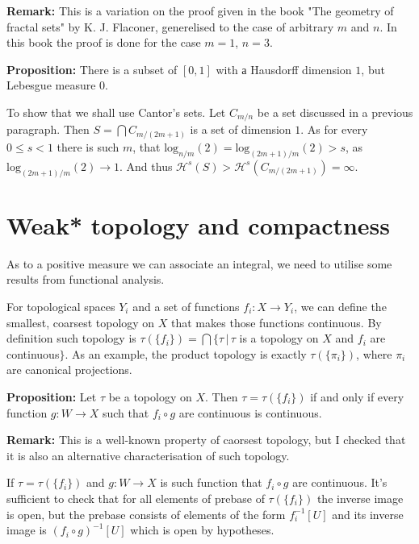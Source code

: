 \documentclass{article}
\begin{document}
\vspace{1ex}
\textbf{Remark:} This is a variation on the proof given in the book "The geometry
of fractal sets" by K. J. Flaconer, generelised to the case of arbitrary $m$ and
$n$. In this book the proof is done for the case $m=1$, $n=3$.

\vspace{1ex}
\textbf{Proposition:} There is a subset of $[0,1]$ with а Hausdorff dimension
$1$, but Lebesgue measure 0.

\vspace{1ex}
To show that we shall use Cantor's sets. Let $C_{m/n}$ be a set discussed in a
previous paragraph. Then $S=\bigcap C_{m/(2m+1)}$ is a set of dimension $1$. As
for every $0\leq s<1$ there is such $m$, that $\text{log}_{n/m}(2)=\text{log}_{
(2m+1)/m}(2)>s$, as $\text{log}_{(2m+1)/m}(2)\rightarrow 1$. And thus $\mathcal
{H}^s(S)>\mathcal{H}^s(C_{m/(2m+1)})=\infty$.

\section{Weak* topology and compactness}
As to a positive measure we can associate an integral, we need to utilise some
results from functional analysis.
\vspace{1ex}

For topological spaces $Y_i$ and a set of functions $f_i:X\rightarrow Y_i$, we can
define the smallest, coarsest topology on $X$ that makes those functions continuous.
By definition such topology is $\tau(\{f_i\})=\bigcap\{\tau\,|\,
\tau$ is a topology on $X$ and $f_i$ are continuous$\}$. As an
example, the product topology is exactly $\tau(\{\pi_i\})$, where $\pi_i$ are
canonical projections.
\vspace{1ex}

\textbf{Proposition:} Let $\tau$ be a topology on $X$. Then $\tau=\tau(\{f_i\})$
if and only if every function $g:W\rightarrow X$ such that $f_i\circ g$ are
continuous is continuous.
\vspace{1ex}

\textbf{Remark:} This is a well-known property of caorsest topology, but I
checked that it is also an alternative characterisation of such topology.

If $\tau=\tau(\{f_i\})$ and $g:W\rightarrow X$ is such function that $f_i\circ
g$ are continuous. It's sufficient to check that for all elements of prebase
of $\tau(\{f_i\})$ the inverse image is open, but the prebase consists of
elements of the form $f_i^{-1}[U]$ and its inverse image is $(f_i\circ g)^{-1}[U]$
which is open by hypotheses.
\vspace{1ex}
\end{document}
